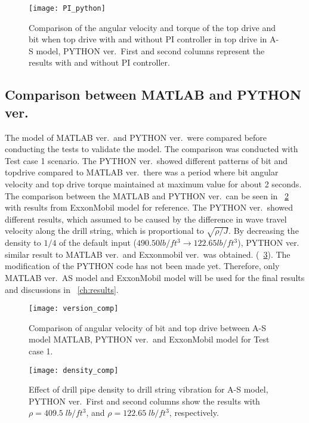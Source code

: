 \begin{figure}
  \centering
  \texttt{[image: PI\_python]}
  \caption[comparison between with and without top drive: PYTHON ver]{Comparison of the angular velocity and torque of the top drive and bit when top drive with and without PI controller in top drive in A-S model, PYTHON ver.\ First and second columns represent the results with and without PI controller.}\label{figure_topdriveremove}
\end{figure}

\subsection{Comparison between MATLAB and PYTHON ver.}
The model of MATLAB ver.\ and PYTHON ver.\ were compared before conducting the tests to validate the model. The comparison was conducted with Test case 1 scenario. The PYTHON ver.\ showed different patterns of bit and topdrive compared to MATLAB ver.\ there was a period where bit angular velocity and top drive torque maintained at maximum value for about 2 seconds. The comparison between the MATLAB and PYTHON ver.\ can be seen in \figurename~\ref{figure_Test1_comp_chASmodel} with results from ExxonMobil model for reference. The PYTHON ver.\ showed different results, which assumed to be caused by the difference in wave travel velocity along the drill string, which is proportional to $\sqrt{\rho/J}$. By decreasing the density to $1/4$ of the default input ($490.50 lb/ft^3 \rightarrow 122.65 lb/ft^3$), PYTHON ver.\, similar result to MATLAB ver.\ and Exxonmobil ver.\ was obtained. (\figurename~\ref{figure_PYTHON_reducedDensity}). The modification of the PYTHON code has not been made yet. Therefore, only MATLAB ver.\ AS model and ExxonMobil model will be used for the final results and discussions in \chaptername~\ref{ch:results}.

\begin{figure}
  \centering
  \texttt{[image: version\_comp]}
  \caption[Comparison between different models for Test case 1]{Comparison of angular velocity of bit and top drive between A-S model MATLAB, PYTHON ver.\ and ExxonMobil model for Test case 1.}\label{figure_Test1_comp_chASmodel}
\end{figure}

\begin{figure}
  \centering
  \texttt{[image: density\_comp]}
  \caption[Effect of drill pipe density in PYTHON ver.\ for Test case 1]{Effect of drill pipe density to drill string vibration for A-S model, PYTHON ver.\ First and second columns show the results with $\rho=409.5\;lb/ft^3$, and  $\rho=122.65\;lb/ft^3$, respectively.}\label{figure_PYTHON_reducedDensity}
\end{figure}


